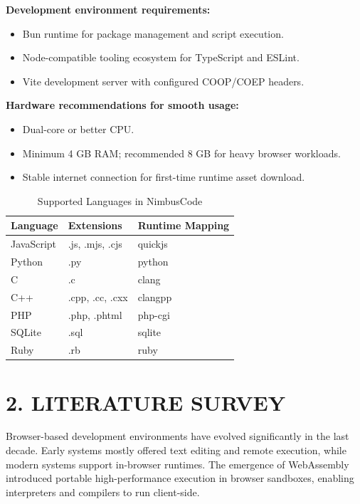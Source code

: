 \textbf{Development environment requirements:}
\begin{itemize}[leftmargin=8mm]
\item Bun runtime for package management and script execution.
\item Node-compatible tooling ecosystem for TypeScript and ESLint.
\item Vite development server with configured COOP/COEP headers.
\end{itemize}

\textbf{Hardware recommendations for smooth usage:}
\begin{itemize}[leftmargin=8mm]
\item Dual-core or better CPU.
\item Minimum 4 GB RAM; recommended 8 GB for heavy browser workloads.
\item Stable internet connection for first-time runtime asset download.
\end{itemize}

\begin{table}[H]
\centering
\caption{Supported Languages in NimbusCode}
\begin{tabular}{lll}
\toprule
\textbf{Language} & \textbf{Extensions} & \textbf{Runtime Mapping} \\
\midrule
JavaScript & .js, .mjs, .cjs & quickjs \\
Python & .py & python \\
C & .c & clang \\
C++ & .cpp, .cc, .cxx & clangpp \\
PHP & .php, .phtml & php-cgi \\
SQLite & .sql & sqlite \\
Ruby & .rb & ruby \\
\bottomrule
\end{tabular}
\end{table}

\newpage
\section{2. LITERATURE SURVEY}

Browser-based development environments have evolved significantly in the last decade. Early systems mostly offered text editing and remote execution, while modern systems support in-browser runtimes. The emergence of WebAssembly introduced portable high-performance execution in browser sandboxes, enabling interpreters and compilers to run client-side.

